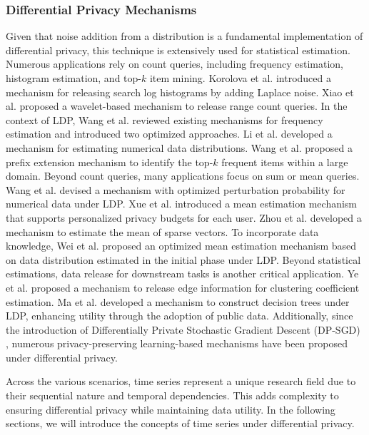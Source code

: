 \subsubsection{Differential Privacy Mechanisms}
Given that noise addition from a distribution is a fundamental implementation of differential privacy, this technique is extensively used for statistical estimation. Numerous applications rely on count queries, including frequency estimation, histogram estimation, and top-$k$ item mining. Korolova et al. \cite{korolova2009releasing} introduced a mechanism for releasing search log histograms by adding Laplace noise. Xiao et al. \cite{xiao2010differential} proposed a wavelet-based mechanism to release range count queries. In the context of LDP, Wang et al. \cite{wang2017locally} reviewed existing mechanisms for frequency estimation and introduced two optimized approaches. Li et al. \cite{li2020estimating} developed a mechanism for estimating numerical data distributions. Wang et al. \cite{wang2019locallyhv} proposed a prefix extension mechanism to identify the top-$k$ frequent items within a large domain. Beyond count queries, many applications focus on sum or mean queries. Wang et al. \cite{wang2019collecting} devised a mechanism with optimized perturbation probability for numerical data under LDP. Xue et al. \cite{xue2022mean} introduced a mean estimation mechanism that supports personalized privacy budgets for each user. Zhou et al. \cite{zhou2022locally} developed a mechanism to estimate the mean of sparse vectors. To incorporate data knowledge, Wei et al. \cite{wei2024aaa} proposed an optimized mean estimation mechanism based on data distribution estimated in the initial phase under LDP. Beyond statistical estimations, data release for downstream tasks is another critical application. Ye et al. \cite{ye2020lf} proposed a mechanism to release edge information for clustering coefficient estimation. Ma et al. \cite{ma2024decision} developed a mechanism to construct decision trees under LDP, enhancing utility through the adoption of public data. Additionally, since the introduction of Differentially Private Stochastic Gradient Descent (DP-SGD) \cite{abadi2016deep}, numerous privacy-preserving learning-based mechanisms have been proposed under differential privacy.

Across the various scenarios, time series represent a unique research field due to their sequential nature and temporal dependencies. This adds complexity to ensuring differential privacy while maintaining data utility. In the following sections, we will introduce the concepts of time series under differential privacy.



